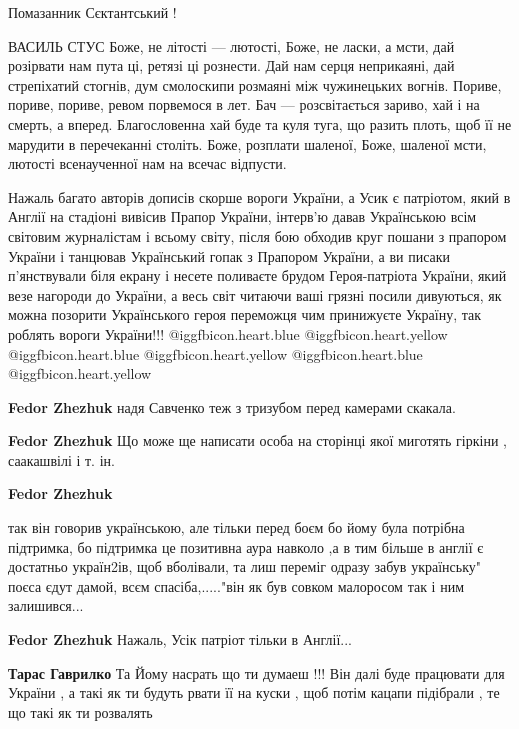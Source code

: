 \begin{itemize}
Помазанник Сєктантський !

\obeycr
ВАСИЛЬ СТУС
Боже, не літості — лютості,
Боже, не ласки, а мсти,
дай розірвати нам пута ці,
ретязі ці рознести.
Дай нам серця неприкаяні,
дай стрепіхатий стогнів,
дум смолоскипи розмаяні
між чужинецьких вогнів.
Пориве, пориве, пориве,
ревом порвемося в лет.
Бач — розсвітається зариво,
хай і на смерть, а вперед.
Благословенна хай буде та
куля туга, що разить
плоть, щоб її не марудити
в перечеканні століть.
Боже, розплати шаленої,
Боже, шаленої мсти,
лютості всенаученної
нам на всечас відпусти.
\restorecr


Нажаль багато авторів дописів скорше вороги України, а Усик є патріотом, який в
Англії на стадіоні вивісив Прапор України, інтерв'ю давав Українською всім
світовим журналістам і всьому світу, після бою обходив круг пошани з прапором
України і танцював Український гопак з Прапором України, а ви писаки
п'янствували біля екрану і несете поливаєте брудом Героя-патріота України, який
везе нагороди до України, а весь світ читаючи ваші грязні посили дивуються, як
можна позорити Українського героя переможця чим принижуєте Україну, так роблять
вороги України!!! @igg{fbicon.heart.blue}  @igg{fbicon.heart.yellow}  @igg{fbicon.heart.blue}  @igg{fbicon.heart.yellow}  @igg{fbicon.heart.blue}  @igg{fbicon.heart.yellow} 

\begin{itemize} %
\textbf{Fedor Zhezhuk} надя Савченко теж з тризубом перед камерами скакала.

\textbf{Fedor Zhezhuk} Що може ще написати особа на сторінці якої миготять гіркіни , саакашвілі і т. ін.

\textbf{Fedor Zhezhuk}

так він говорив українською, але тільки перед боєм бо йому була потрібна
підтримка, бо підтримка це позитивна аура навколо ,а в тим більше в англії є
достатньо україн2ів, щоб вболівали, та лиш переміг одразу забув українську" поєса
єдут дамой, всєм спасіба,....."він як був совком малоросом так і ним
залишився...


\textbf{Fedor Zhezhuk} Нажаль, Усік патріот тільки в Англії...

\textbf{Тарас Гаврилко} Та Йому насрать що ти думаеш !!! Він далі буде працювати для України , а такі як ти будуть рвати її на куски , щоб потім кацапи підібрали , те що такі як ти розвалять


\end{itemize}
\end{itemize}
